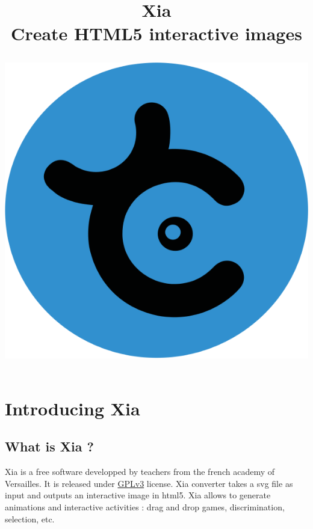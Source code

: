 

\title{Xia\\ Create HTML5 interactive images\\
\begin{center}
\includegraphics[scale=0.5]{./images/xia-logo}
\end{center}}


 \maketitle
 \tableofcontents
  
  \renewcommand{\figurename}{Figure}
  \renewcommand{\tablename}{Table}
  \renewcommand{\listfigurename}{List of figures}
  
  
\section{Introducing Xia}

\subsection{What is Xia ?}

Xia is a free software developped by teachers from the french academy of Versailles.
It is released under \href{http://www.gnu.org/copyleft/gpl.html}{GPLv3} license.
Xia converter takes a svg file as input and outputs an interactive image in 
html5. Xia allows to generate animations and interactive activities : 
drag and drop games, discrimination, selection, etc.

